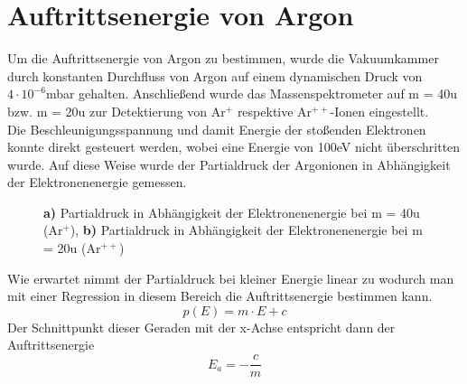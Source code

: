 \section{Auftrittsenergie von Argon}
\label{sec:argon}

Um die Auftrittsenergie von Argon zu bestimmen, wurde die Vakuumkammer durch konstanten Durchfluss von Argon auf einem dynamischen Druck von $4\cdot 10^{-6}$\;mbar gehalten.
Anschließend wurde das Massenspektrometer auf m = 40\;u bzw. m = 20\;u zur Detektierung von Ar$^{+}$ respektive Ar$^{++}$-Ionen eingestellt.\\
Die Beschleunigungsspannung und damit Energie der stoßenden Elektronen konnte direkt gesteuert werden, wobei eine Energie von 100\;eV nicht überschritten wurde.
Auf diese Weise wurde der Partialdruck der Argonionen in Abhängigkeit der Elektronenenergie gemessen.

\begin{figure}[h]
	\centering
	\caption{\textbf{a)} Partialdruck in Abhängigkeit der Elektronenenergie bei m = 40\;u (Ar$^+$), \textbf{b)} Partialdruck in Abhängigkeit der Elektronenenergie bei m = 20\;u (Ar$^{++}$)}
	\label{fig:plot_argon}
\end{figure}

Wie erwartet nimmt der Partialdruck bei kleiner Energie linear zu wodurch man mit einer Regression in diesem Bereich die Auftrittsenergie bestimmen kann.
\begin{equation}
	p(E) = m\cdot E + c
\end{equation}
Der Schnittpunkt dieser Geraden mit der x-Achse entspricht dann der Auftrittsenergie
\begin{equation}
	E_a = -\frac{c}{m}
\end{equation}

